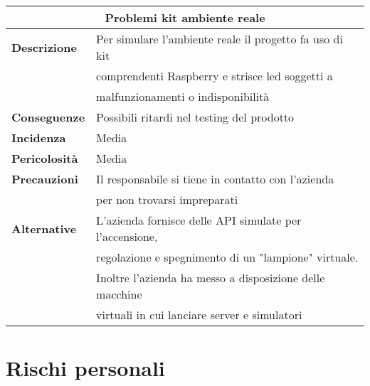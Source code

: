\begin{center}
    \begin{tabularx}{0.8\linewidth}{l|l}
        \multicolumn{2}{c}{\textbf{Problemi kit ambiente reale}}                                                \\
        \hline{\textbf{Descrizione}}    & Per simulare l'ambiente reale il progetto fa uso di kit               \\ 
                                        & comprendenti Raspberry e strisce led soggetti a                       \\ 
                                        & malfunzionamenti o indisponibilità                                    \\
        \textbf{Conseguenze}            & Possibili ritardi nel testing del prodotto                            \\
        \textbf{Incidenza}              & Media                                                                 \\
        \textbf{Pericolosità}           & Media                                                                 \\
        \textbf{Precauzioni}            & Il responsabile si tiene in contatto con l'azienda                    \\ 
                                        & per non trovarsi impreparati                                          \\
        \textbf{Alternative}            & L'azienda fornisce delle API simulate per l'accensione,               \\ 
                                        & regolazione e spegnimento di un "lampione" virtuale.                  \\ 
                                        & Inoltre l'azienda ha messo a disposizione delle macchine              \\ 
                                        & virtuali in cui lanciare server e simulatori                          \\      
    \end{tabularx}
\end{center}

\section{Rischi personali}

